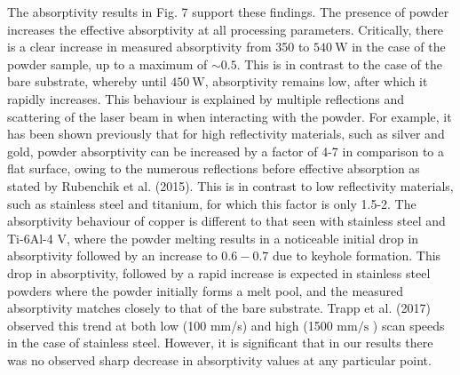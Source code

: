 \documentclass[10pt]{article}
\begin{document}
The absorptivity results in Fig. 7 support these findings. The presence of powder increases the effective absorptivity at all processing parameters. Critically, there is a clear increase in measured absorptivity from 350 to $540 \mathrm{~W}$ in the case of the powder sample, up to a maximum of $\sim 0.5$. This is in contrast to the case of the bare substrate, whereby until $450 \mathrm{~W}$, absorptivity remains low, after which it rapidly increases. This behaviour is explained by multiple reflections and scattering of the laser beam in when interacting with the powder. For example, it has been shown previously that for high reflectivity materials, such as silver and gold, powder absorptivity can be increased by a factor of 4-7 in comparison to a flat surface, owing to the numerous reflections before effective absorption as stated by Rubenchik et al. (2015). This is in contrast to low reflectivity materials, such as stainless steel and titanium, for which this factor is only 1.5-2. The absorptivity behaviour of copper is different to that seen with stainless steel and Ti-6Al-4 V, where the powder melting results in a noticeable initial drop in absorptivity followed by an increase to $0.6-0.7$ due to keyhole formation. This drop in absorptivity, followed by a rapid increase is expected in stainless steel powders where the powder initially forms a melt pool, and the measured absorptivity matches closely to that of the bare substrate. Trapp et al. (2017) observed this trend at both low (100 mm/s) and high (1500 $\mathrm{mm} / \mathrm{s}$ ) scan speeds in the case of stainless steel. However, it is significant that in our results there was no observed sharp decrease in absorptivity values at any particular point.
\end{document}
